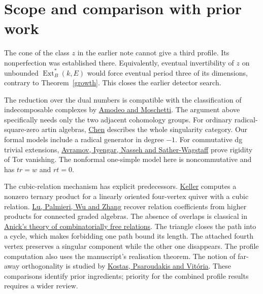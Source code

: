 \documentclass[11pt]{article}
\newcommand{\Ext}{\operatorname{Ext}}
\begin{document}
\section{Scope and comparison with prior work}
The cone of the class $z$ in the earlier note cannot give a third
profile. Its nonperfection was established there. Equivalently,
eventual invertibility of $z$ on unbounded $\Ext_B^*(k,E)$ would force
eventual period three of its dimensions, contrary to Theorem~\ref{growth}.
This closes the earlier detector search.

The reduction over the dual numbers is compatible with the classification
of indecomposable complexes by \href{https://arxiv.org/abs/1309.7215}{Amodeo
and Moschetti}. The argument above specifically needs only the two adjacent
cohomology groups. For ordinary radical-square-zero artin algebras,
\href{https://arxiv.org/abs/1104.4006}{Chen} describes the whole singularity
category. Our formal models include a radical generator in degree $-1$.
For commutative dg trivial extensions, \href{https://arxiv.org/abs/1508.00748}
{Avramov, Iyengar, Nasseh and Sather-Wagstaff} prove rigidity of Tor
vanishing. The nonformal one-simple model here is noncommutative and has
$tr=w$ and $rt=0$.

The cubic-relation mechanism has explicit predecessors.
\href{https://webusers.imj-prg.fr/~bernhard.keller/publ/IntroAinfEdinb.pdf}
{Keller} computes a nonzero ternary product for a linearly oriented
four-vertex quiver with a cubic relation.
\href{https://arxiv.org/abs/math/0606144}{Lu, Palmieri, Wu and Zhang}
recover relation coefficients from higher products for connected graded
algebras. The absence of overlaps is classical in
\href{https://doi.org/10.1016/0021-8693(82)90104-1}{Anick's theory of
combinatorially free relations}. The triangle closes the path into a cycle,
which makes forbidding one path bound its length. The attached fourth
vertex preserves a singular component while the other one disappears.
The profile computation also uses the manuscript's realisation theorem.
The notion of far-away orthogonality is studied by
\href{https://arxiv.org/abs/2512.18417}{Kostas, Psaroudakis and
Vit\'oria}. These comparisons identify prior ingredients; priority for
the combined profile results requires a wider review.
\end{document}
